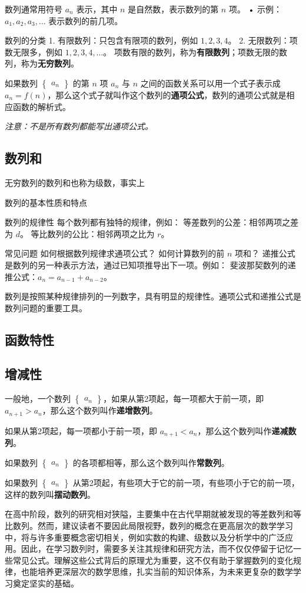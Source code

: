 数列通常用符号 $a_n$ 表示，其中 $n$ 是自然数，表示数列的第 $n$ 项。
	•	示例：$a_1, a_2, a_3, \dots$ 表示数列的前几项。

数列的分类
	1.	有限数列：只包含有限项的数列，例如 $1, 2, 3, 4$。
	2.	无限数列：项数无限多，例如 $1, 2, 3, 4, \dots$。
项数有限的数列，称为\textbf{有限数列}；项数无限的数列，称为\textbf{无穷数列}。

如果数列 $\begin{Bmatrix} a_n \end{Bmatrix}$ 的第 $n$ 项 $a_n$ 与 $n$ 之间的函数关系可以用一个式子表示成 $a_n = f(n)$，那么这个式子就叫作这个数列的\textbf{通项公式}，数列的通项公式就是相应函数的解析式。

\textsl{注意：不是所有数列都能写出通项公式。}

\subsection{数列和}

无穷数列的数列和也称为级数，事实上


数列的基本性质和特点

数列的规律性
每个数列都有独特的规律，例如：
等差数列的公差：相邻两项之差为 $d$。
等比数列的公比：相邻两项之比为 $r$。

常见问题
如何根据数列规律求通项公式？
如何计算数列的前 $n$ 项和？
递推公式是数列的另一种表示方法，通过已知项推导出下一项。例如：
斐波那契数列的递推公式：$a_n = a_{n-1} + a_{n-2}$。

数列是按照某种规律排列的一列数字，具有明显的规律性。通项公式和递推公式是数列问题的重要工具。
\subsection{函数特性}

\subsection{增减性}
一般地，一个数列 $\begin{Bmatrix} a_n \end{Bmatrix}$，如果从第2项起，每一项都大于前一项，即 $a_{n+1}>a_n$，那么这个数列叫作\textbf{递增数列}。

如果从第2项起，每一项都小于前一项，即 $a_{n+1}<a_n$，那么这个数列叫作\textbf{递减数列}。

如果数列 $\begin{Bmatrix} a_n \end{Bmatrix}$ 的各项都相等，那么这个数列叫作\textbf{常数列}。

如果数列 $\begin{Bmatrix} a_n \end{Bmatrix}$ 从第2项起，有些项大于它的前一项，有些项小于它的前一项，这样的数列叫\textbf{摆动数列}。


在高中阶段，数列的研究相对狭隘，主要集中在古代早期就被发现的等差数列和等比数列。然而，建议读者不要因此局限视野，数列的概念在更高层次的数学学习中，将与许多重要概念密切相关，例如实数的构建、级数以及分析学中的广泛应用。因此，在学习数列时，需要多关注其规律和研究方法，而不仅仅停留于记忆一些常见公式。理解这些公式背后的原理尤为重要，这不仅有助于掌握数列的变化规律，也能培养更深层次的数学思维，扎实当前的知识体系，为未来更复杂的数学学习奠定坚实的基础。